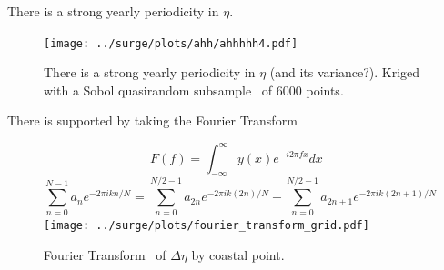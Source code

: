 \begin{frame}{There is a strong yearly periodicity in $\eta$. }
\vspace{-20pt}
\begin{figure}[htb!]
    \centering
    \texttt{[image: ../surge/plots/ahh/ahhhhh4.pdf]}
    \vspace{-7pt}
    \caption{There is a strong yearly periodicity in $\eta$ (and its variance?).
     Kriged with a Sobol quasirandom subsample~\cite{sobol1967distribution} of 6000 points.}
\end{figure}
\end{frame}


\begin{frame}{There is  supported by taking the Fourier Transform }
\vspace{-40pt}
\begin{figure}[htb!]
    \centering
    \begin{equation}
F(f)=\int_{-\infty}^{\infty} y(x) e^{-i 2\pi f x} d x
\end{equation}
\begin{equation}
\sum_{n=0}^{N-1} a_{n} e^{-2 \pi i  k n/ N}=\sum_{n=0}^{N / 2-1} a_{2 n}
e^{-2 \pi i k (2 n)/ N} +\sum_{n=0}^{N / 2-1} a_{2n+1} e^{-2 \pi i k (2 n+1)/ N}
\end{equation}
    \texttt{[image: ../surge/plots/fourier\_transform\_grid.pdf]}
    \vspace{-7pt}
    \caption{Fourier Transform~\cite{cooley1965algorithm} of $\Delta\eta$ by coastal point.}
\end{figure}
\end{frame}


